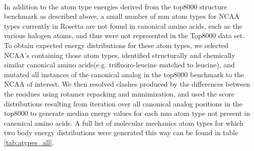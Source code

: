 \paragraph{}
In addition to the atom type energies derived from the top8000 structure benchmark as described above, a small number of mm atom types for NCAA types currently in Rosetta are not found in canonical amino acids, such as the various halogen atoms, and thus were not represented in the Top8000 data set.
To obtain expected energy distributions for these atom types, we selected NCAA's containing those atom types, identified structurally and chemically similar canonical amino acids(e.g. trifluoro-leucine matched to leucine), and mutated all instances of the canonical analog in the top8000 benchmark to the NCAA of interest.
We then resolved clashes produced by the differences between the residues using rotamer repacking and mimimization, and used the score distributions resulting from iteration over all canonical analog positions in the top8000 to generate median energy values for each mm atom type not present in canonical amino acids.
A full list of molecular mechanics atom types for which two body energy distributions were generated this way can be found in table \ref{tab:atypes_all}.


